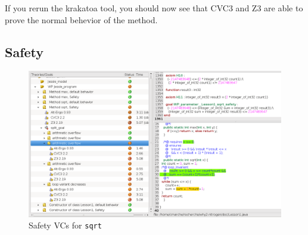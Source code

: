 \documentclass[a4paper,11pt,twoside,openright]{report}
\begin{document}
If you rerun the krakatoa tool, you should now see that CVC3 and Z3 are able to prove the normal behevior of the method.
% 



\subsection*{Safety}

\begin{figure}[t]
  \begin{center}
    \includegraphics[width=\textwidth]{Lesson1_isqrt_why3_2.png}
  \end{center}
  \caption{Safety VCs for \texttt{sqrt}}
\label{fig:sqrt2}
\hrulefill
\end{figure}
\end{document}
